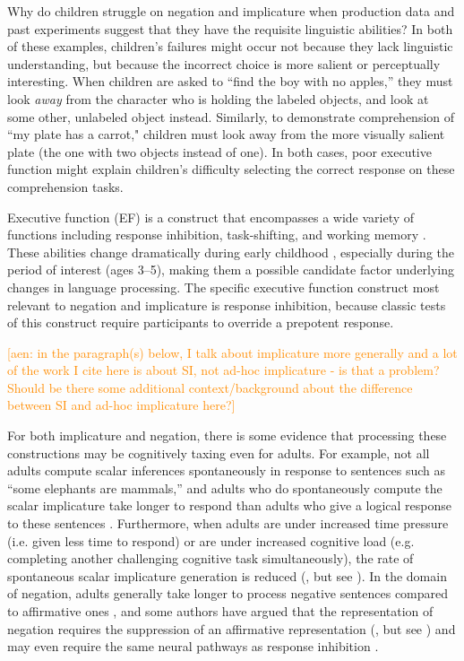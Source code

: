 \documentclass[man, noapacite]{apa2}
\newcommand{\aen}[1]{\textcolor{DarkOrange}{[aen: #1]}}
\begin{document}
Why do children struggle on negation and implicature when production data and past experiments suggest that they have the requisite linguistic abilities? In both of these examples, children's failures might occur not because they lack linguistic understanding, but because the incorrect choice is more salient or perceptually interesting. When children are asked to ``find the boy with no apples,'' they must look \emph{away} from the character who is holding the labeled objects, and look at some other, unlabeled object instead. Similarly, to demonstrate comprehension of ``my plate has a carrot," children must look away from the more visually salient plate (the one with two objects instead of one). In both cases, poor executive function might explain children's difficulty selecting the correct response on these comprehension tasks.

Executive function (EF) is a construct that encompasses a wide variety of functions including response inhibition, task-shifting, and working memory \cite{miyake2000}. These abilities change dramatically during early childhood \cite{diamond1996,davidson2006}, especially during the period of interest (ages 3--5), making them a possible candidate factor underlying changes in language processing. The specific executive function construct most relevant to negation and implicature is response inhibition, because classic tests of this construct require participants to override a prepotent response. 

\aen{in the paragraph(s) below, I talk about implicature more generally and a lot of the work I cite here is about SI, not ad-hoc implicature - is that a problem? Should be there some additional context/background about the difference between SI and ad-hoc implicature here?}

For both implicature and negation, there is some evidence that processing these constructions may be cognitively taxing even for adults. For example, not all adults compute scalar inferences spontaneously in response to sentences such as ``some elephants are mammals,'' and adults who do spontaneously compute the scalar implicature take longer to respond than adults who give a logical response to these sentences \cite{noveck2003, bott2004}. Furthermore, when adults are under increased time pressure (i.e. given less time to respond) or are under increased cognitive load (e.g. completing another challenging cognitive task simultaneously), the rate of spontaneous scalar implicature generation is reduced (, but see \cite{grodner2010}). In the domain of negation, adults generally take longer to process negative sentences compared to affirmative ones \cite{hclark1972}, and some authors have argued that the representation of negation requires the suppression of an affirmative representation (, but see \cite{tian2010}) and may even require the same neural pathways as response inhibition \cite{vega2016, beltran2019, beltran2021, liu2020}. 
\end{document}
